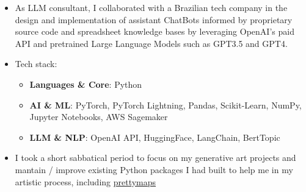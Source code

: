 {
\begin{itemize}
\item As LLM consultant, I collaborated with a Brazilian tech company in the design and implementation of assistant ChatBots informed by proprietary source code and spreadsheet knowledge bases by leveraging OpenAI's paid API and pretrained Large Language Models such as GPT3.5 and GPT4.
\item Tech stack:
\begin{itemize}
    \item \textbf{Languages \& Core}: {\color{accent2}Python}
    \item \textbf{AI \& ML}: {\color{accent2}PyTorch, PyTorch Lightning, Pandas, Scikit-Learn, NumPy, Jupyter Notebooks, AWS Sagemaker}
    \item \textbf{LLM \& NLP}: {\color{accent2}OpenAI API, HuggingFace, LangChain, BertTopic}
\end{itemize}
\end{itemize}

\begin{itemize}
\item I took a short sabbatical period to focus on my generative art projects and mantain / improve existing Python packages I had built to help me in my artistic process, including \href{https://github.com/marcelopprates/prettymaps}{prettymaps}
\end{itemize}

\divider

}
